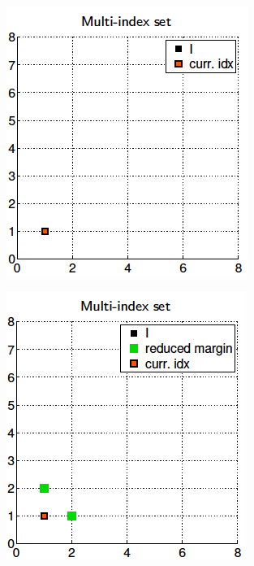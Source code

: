  \begin{figure}[htb]
 	\centering %
 	\begin{subfigure}{0.165\textwidth}
 		\includegraphics[width=\linewidth]{./figures/MISC_construction/1}
 		\caption{}
 		\label{fig:1}
 	\end{subfigure}\hfil %
 	\begin{subfigure}{0.165\textwidth}
 		\includegraphics[width=\linewidth]{./figures/MISC_construction/2}

\end{subfigure}
\end{figure}
